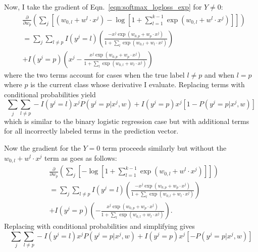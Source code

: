 \documentclass[12pt]{amsart}
\begin{document}
Now, I take the gradient of Eqn.~\ref{eqn:softmax_logloss_exp} for $Y \neq 0$:
\begin{equation} \label{eqn:softmax_grad_neq}
\begin{split}
& \frac{\partial}{\partial w_p} \left( \sum_j \left[(w_{0,l} + w^l \cdot x^j) - \log[1 + \sum_{l= 1}^{k-1}\exp{(w_{0,l} + w^l \cdot x^j)}]\right] \right) \\
& = \sum_j  \sum_{l \neq p} I(y^j = l) \left( \frac{-x^j \exp(w_{0,p} + w_p \cdot x^j)}{1 + \sum_l \exp(w_{0,l} + w_l \cdot x^j)} \right)  \\
& + I(y^j = p) \left( x^j - \frac{x^j \exp(w_{0,p} + w_p \cdot x^j)}{1 + \sum_l \exp(w_{0,l} + w_l \cdot x^j)} \right)
\end{split}
\end{equation}
where the two terms account for cases when the true label $l \neq p$ and when $l = p$ where $p$ is the current class whose derivative I evaluate.  Replacing terms with conditional probabilities yield
\begin{equation}
\sum_j \sum_{l \neq p} -I(y^j = l) x^j P(y^j = p | x^j, w) + I(y^j = p) x^j \left[1 - P(y^j = p | x^j, w) \right]
\end{equation}
which is similar to the binary logistic regression case but with additional terms for all incorrectly labeled terms in the prediction vector.

Now the gradient for the $Y = 0$ term proceeds similarly but without the $w_{0,l} + w^l \cdot x^j$ term as goes as follows: 
\begin{equation} \label{eqn:softmax_grad_eq}
\begin{split}
& \frac{\partial}{\partial w_p} \left( \sum_j \left[- \log[1 + \sum_{l= 1}^{k-1}\exp{(w_{0,l} + w^l \cdot x^j)}]\right] \right) \\
& = \sum_j  \sum_{l \neq p} I(y^j = l) \left( \frac{-x^j \exp(w_{0,p} + w_p \cdot x^j)}{1 + \sum_l \exp(w_{0,l} + w_l \cdot x^j)} \right)  \\
& + I(y^j = p) \left( - \frac{x^j \exp(w_{0,p} + w_p \cdot x^j)}{1 + \sum_l \exp(w_{0,l} + w_l \cdot x^j)} \right).
\end{split}
\end{equation}
Replacing with conditional probabilities and simplifying gives
\begin{equation}
\sum_j \sum_{l \neq p} -I(y^j = l) x^j P(y^j = p | x^j, w) + I(y^j = p) x^j \left[- P(y^j = p | x^j, w) \right]
\end{equation}
\end{document}
